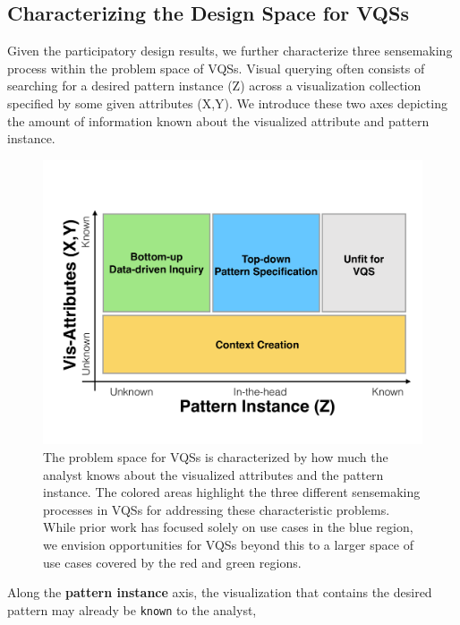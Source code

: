 \subsection{Characterizing the Design Space for VQSs}
Given the participatory design results, 
we further characterize three sensemaking process 
within the problem space of VQSs. 
Visual querying often consists of searching for 
a desired pattern instance (Z) 
across a visualization collection specified by some 
given attributes (X,Y). 
We introduce these two axes depicting the 
amount of information known 
about the visualized attribute and pattern instance.%
\begin{figure}[h!]
  \centering
  \includegraphics[width=\linewidth]{figures/2dmodel.pdf}
  \caption{The problem space for VQSs is characterized by how much the analyst knows about the visualized attributes and the pattern instance. The colored areas highlight the three different sensemaking processes in VQSs for addressing these characteristic problems. While prior work has focused solely on use cases in the blue region, we envision opportunities for VQSs beyond this to a larger space of use cases covered by the red and green regions.}
  \label{2dmodel}
\end{figure}
\par Along the \textbf{pattern instance} axis, 
the visualization that contains 
the desired pattern may already be \texttt{known} to the analyst, 
